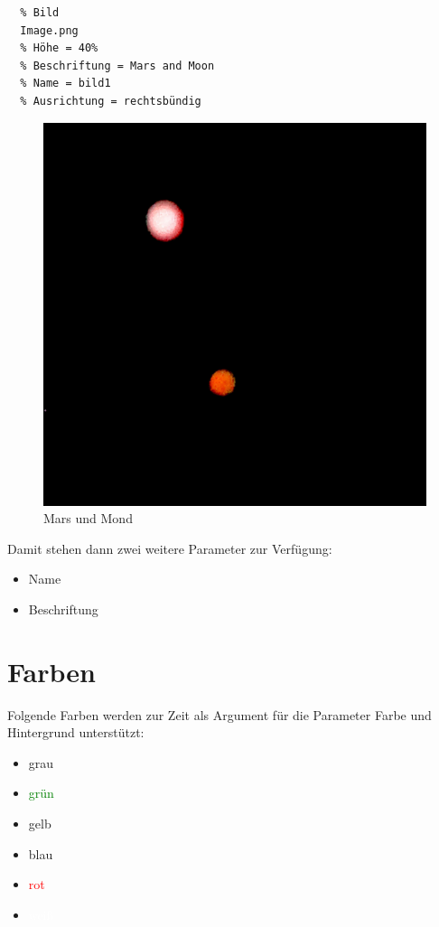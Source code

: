 \documentclass{scrartcl}
\begin{document}
\begin{verbatim}
  % Bild
  Image.png
  % Höhe = 40%
  % Beschriftung = Mars and Moon
  % Name = bild1
  % Ausrichtung = rechtsbündig
\end{verbatim}


\begin{figure}[hbt]
\raggedleft%
\includegraphics[height=.40\textheight]{Image.png}
\caption{Mars und Mond}
\label{bild1}
\end{figure}


{Damit stehen dann zwei weitere Parameter zur Verfügung:\\}

\begin{itemize}
\item Name
\item Beschriftung
\end{itemize}


\section{Farben}

{Folgende Farben werden zur Zeit als Argument für die
Parameter Farbe und Hintergrund unterstützt:\\}

\colorbox{gray!75}{\parbox{\linewidth}{%
\begin{itemize}
\item grau
\item \textcolor{green}{grün}
\item \textcolor{LightYellow1}{gelb}
\item \textcolor{PaleTurquoise1}{blau}
\item \textcolor{red}{rot}
\item \textcolor{white}{weiß}
\end{itemize}

}
}
\end{document}
